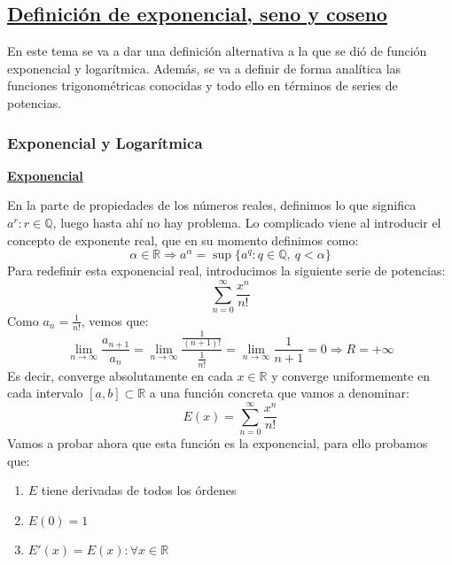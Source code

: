 \documentclass[10pt,a4paper,openright]{book}
\begin{document}
\subsection*{\underline{Definición de exponencial, seno y coseno}}
En este tema se va a dar una definición alternativa a la que se dió de función exponencial y logarítmica. Además, se va a definir de forma analítica las funciones trigonométricas conocidas y todo ello en términos de series de potencias.

\newpage
\subsubsection*{Exponencial y Logarítmica}
\underline{\textbf{Exponencial}}

En la parte de propiedades de los números reales, definimos lo que significa $a^r: r\in \mathbb Q$, luego hasta ahí no hay problema. Lo complicado viene al introducir el concepto de exponente real, que en su momento definimos como:
$$\alpha \in \mathbb{R}\Rightarrow a^\alpha = \sup\{a^q : q \in \mathbb{Q} ,\  q < \alpha \}$$
Para redefinir esta exponencial real, introducimos la siguiente serie de potencias:
$$\sum_{n=0}^{\infty} \frac{x^n}{n!}$$
Como $a_n = \frac{1}{n!}$, vemos que:
$$\lim_{n \to \infty} \frac{a_{n+1}}{a_n} = \lim_{n \to \infty} \frac{\frac{1}{(n+1)!}}{\frac{1}{n!}} = \lim_{n \to \infty} \frac{1}{n+1} = 0 \Rightarrow R = +\infty$$
Es decir, converge absolutamente en cada $x \in \mathbb{R}$ y converge uniformemente en cada intervalo $[a,b] \subset \mathbb{R}$ a una función concreta que vamos a denominar: 
$$E(x) = \sum_{n = 0}^{\infty} \frac{x^n}{n!}$$
Vamos a probar ahora que esta función es la exponencial, para ello probamos que:
\begin{enumerate}
\item $E$ tiene derivadas de todos los órdenes
\item $E(0) = 1$
\item $E'(x) = E(x) : \forall x \in \mathbb{R}$
\end{enumerate}
\end{document}
